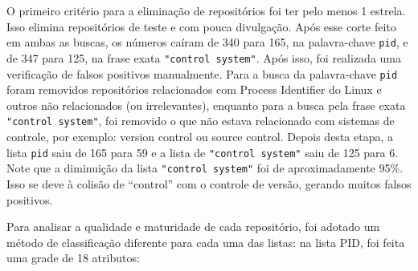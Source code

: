 O primeiro critério para a eliminação de repositórios foi ter pelo menos 1 estrela. Isso elimina repositórios de teste e com pouca divulgação. Após esse corte feito em ambas as buscas, os números caíram de 340 para 165, na palavra-chave \texttt{pid}, e de 347 para 125, na frase exata \texttt{"control system"}. Após isso, foi realizada uma verificação de falsos positivos manualmente. Para a busca da palavra-chave \texttt{pid} foram removidos repositórios relacionados com Process Identifier do Linux e outros não relacionados (ou irrelevantes), enquanto para a busca pela frase exata \texttt{"control system"}, foi removido o que não estava relacionado com sistemas de controle, por exemplo: version control ou source control. Depois desta etapa, a lista \texttt{pid} saiu de 165 para 59 e a lista de \texttt{"control system"} saiu de 125 para 6. Note que a diminuição da lista \texttt{"control system"} foi de aproximadamente 95\%. Isso se deve à colisão de ``control'' com o controle de versão, gerando muitos falsos positivos.

Para analisar a qualidade e maturidade de cada repositório, foi adotado um método de classificação diferente para cada uma das listas: na lista \ac{PID}, foi feita uma grade de 18 atributos:

